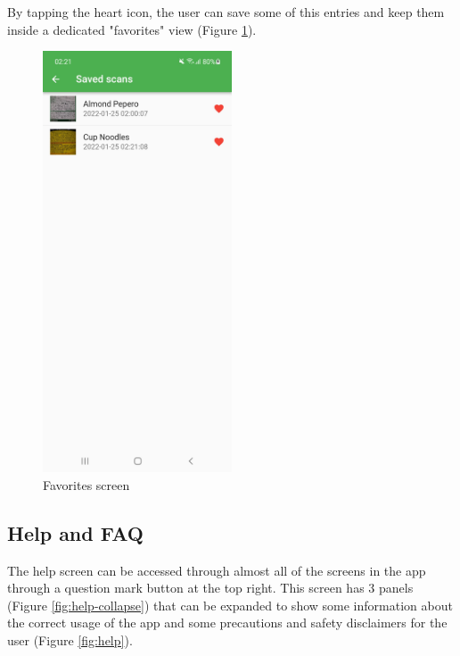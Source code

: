 By tapping the heart icon, the user can save some of this entries and keep them inside a dedicated "favorites" view (Figure \ref{fig:favs}).

\begin{figure}[h]
  \centering
  \includegraphics[width=0.5\textwidth]{Figures/Screenshot/favs.jpg}
  \caption{%
    Favorites screen
  }
  \label{fig:favs}
\end{figure}

\clearpage

\subsection{Help and FAQ}

The help screen can be accessed through almost all of the screens in the app through a question mark button at the top right. This screen has 3 panels (Figure \ref{fig:help-collapse}) that can be expanded to show some information about the correct usage of the app and some precautions and safety disclaimers for the user (Figure \ref{fig:help}).

